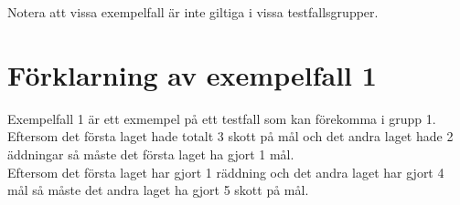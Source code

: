 Notera att vissa exempelfall är inte giltiga i vissa testfallsgrupper.

\section*{Förklarning av exempelfall 1}
Exempelfall 1 är ett exmempel på ett testfall som kan förekomma i grupp 1.\\
Eftersom det första laget hade totalt 3 skott på mål och det andra laget hade 2 äddningar så måste det första laget ha gjort 1 mål.\\
Eftersom det första laget har gjort 1 räddning och det andra laget har gjort 4 mål så måste det andra laget ha gjort 5 skott på mål.
